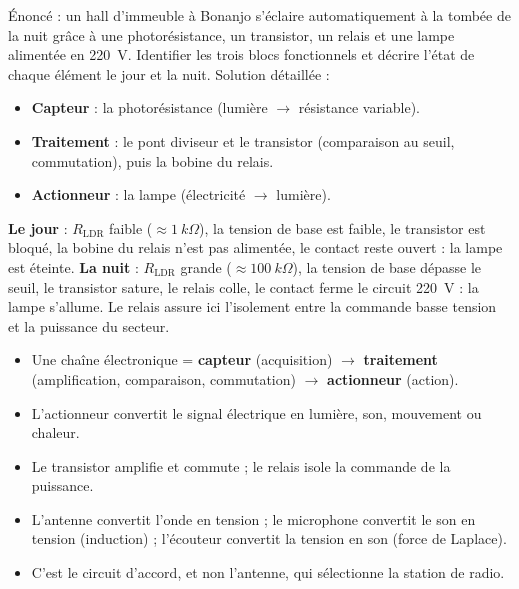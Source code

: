 \documentclass[11pt]{article}
\begin{document}
\begin{exoresolu}
Énoncé : un hall d'immeuble à Bonanjo s'éclaire automatiquement à la tombée de la nuit grâce à une photorésistance, un transistor, un relais et une lampe alimentée en \SI{220}{V}. Identifier les trois blocs fonctionnels et décrire l'état de chaque élément le jour et la nuit.
\tcblower
Solution détaillée :
\begin{itemize}
\item \textbf{Capteur} : la photorésistance (lumière $\to$ résistance variable).
\item \textbf{Traitement} : le pont diviseur et le transistor (comparaison au seuil, commutation), puis la bobine du relais.
\item \textbf{Actionneur} : la lampe (électricité $\to$ lumière).
\end{itemize}
\textbf{Le jour} : $R_{\text{LDR}}$ faible ($\approx \SI{1}{k\Omega}$), la tension de base est faible, le transistor est bloqué, la bobine du relais n'est pas alimentée, le contact reste ouvert : la lampe est éteinte.
\textbf{La nuit} : $R_{\text{LDR}}$ grande ($\approx \SI{100}{k\Omega}$), la tension de base dépasse le seuil, le transistor sature, le relais colle, le contact ferme le circuit \SI{220}{V} : la lampe s'allume. Le relais assure ici l'isolement entre la commande basse tension et la puissance du secteur.
\end{exoresolu}

\begin{aretenir}[L'essentiel]
\begin{itemize}
\item Une chaîne électronique = \textbf{capteur} (acquisition) $\to$ \textbf{traitement} (amplification, comparaison, commutation) $\to$ \textbf{actionneur} (action).
\item L'actionneur convertit le signal électrique en lumière, son, mouvement ou chaleur.
\item Le transistor amplifie et commute ; le relais isole la commande de la puissance.
\item L'antenne convertit l'onde en tension ; le microphone convertit le son en tension (induction) ; l'écouteur convertit la tension en son (force de Laplace).
\item C'est le circuit d'accord, et non l'antenne, qui sélectionne la station de radio.
\end{itemize}
\end{aretenir}

\newpage
\end{document}
